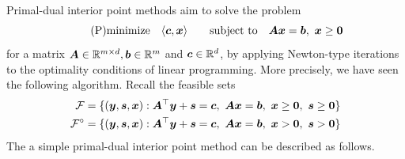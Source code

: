 Primal-dual interior point methods aim to solve the problem
\begin{equation}\label{eq:standard}\tag{P}
 \minimize \ip{\vct{c}}{\vct{x}} \quad \subjto \mtx{A}\vct{x}=\vct{b}, \ \vct{x}\geq \zerovct
\end{equation}
for a matrix $\bm{A}\in \mathbb{R}^{m\times d}, \bm{b}\in \mathbb{R}^m$ and $\bm{c}\in \mathbb{R}^d$, by applying Newton-type iterations to the optimality conditions of linear programming. More precisely, we have seen the following algorithm. Recall the feasible sets
\begin{align*}
 \mathcal{F} &= \{(\vct{y},\vct{s},\vct{x}) \mid \mtx{A}^{\trans}\vct{y}+\vct{s}=\vct{c}, \ \mtx{A}\vct{x}=\vct{b}, \ \vct{x}\geq \zerovct, \ \vct{s}\geq \zerovct\}\\
 \mathcal{F}^{\circ} &= \{(\vct{y},\vct{s},\vct{x}) \mid \mtx{A}^{\trans}\vct{y}+\vct{s}=\vct{c}, \ \mtx{A}\vct{x}=\vct{b}, \ \vct{x}> \zerovct, \ \vct{s}> \zerovct\}\\
\end{align*}
The a simple primal-dual interior point method can be described as follows.
